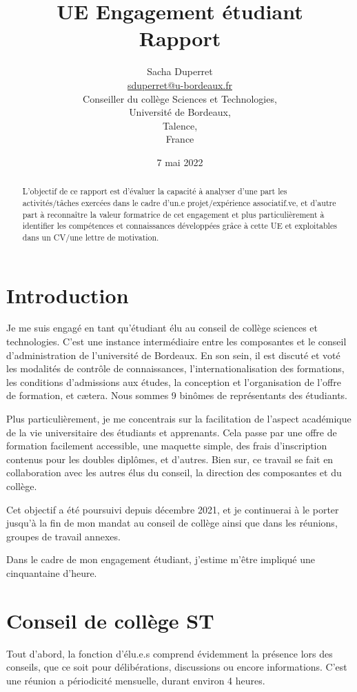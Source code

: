 \documentclass{article}
\title{{\huge UE Engagement étudiant\\Rapport}}
\author{$ $\\{\LARGE Sacha Duperret}\\ $ $\\ \href{mailto:sduperret@u-bordeaux.fr}{sduperret@u-bordeaux.fr}\\Conseiller du collège Sciences et Technologies,\\Université de Bordeaux,\\Talence,\\France}
\date{7 mai 2022}
\begin{document}
\maketitle

\vspace{20pt}

\tableofcontents

\vspace{50pt}

\begin{abstract}
L'objectif de ce rapport est d'évaluer la capacité à analyser d’une part les activités/tâches exercées dans le cadre d'un.e projet/expérience associatif.ve, et d’autre part à reconnaître la valeur formatrice de cet engagement et plus particulièrement à identifier les compétences et connaissances développées grâce à cette UE et exploitables dans un CV/une lettre de motivation.
\end{abstract}

\newpage \section*{Introduction}

Je me suis engagé en tant qu'étudiant élu au conseil de collège sciences et technologies. C'est une instance intermédiaire entre les composantes et le conseil d'administration de l'université de Bordeaux. En son sein, il est discuté et voté les modalités de contrôle de connaissances, l'internationalisation des formations, les conditions d'admissions aux études, la conception et l'organisation de l'offre de formation, et cætera. Nous sommes 9 binômes de représentants des étudiants.

Plus particulièrement, je me concentrais sur la facilitation de l'aspect académique de la vie universitaire des étudiants et apprenants. Cela passe par une offre de formation facilement accessible, une maquette simple, des frais d'inscription contenus pour les doubles diplômes, et d'autres. Bien sur, ce travail se fait en collaboration avec les autres élus du conseil, la direction des composantes et du collège.

Cet objectif a été poursuivi depuis décembre 2021, et je continuerai à le porter jusqu'à la fin de mon mandat au conseil de collège ainsi que dans les réunions, groupes de travail annexes.

\newpage
Dans le cadre de mon engagement étudiant, j'estime m'être impliqué une cinquantaine d'heure.

\section{Conseil de collège ST} 
Tout d'abord, la fonction d'élu.e.s comprend évidemment la présence lors des conseils, que ce soit pour délibérations, discussions ou encore informations. C'est une réunion a périodicité mensuelle, durant environ 4 heures.
\end{document}
